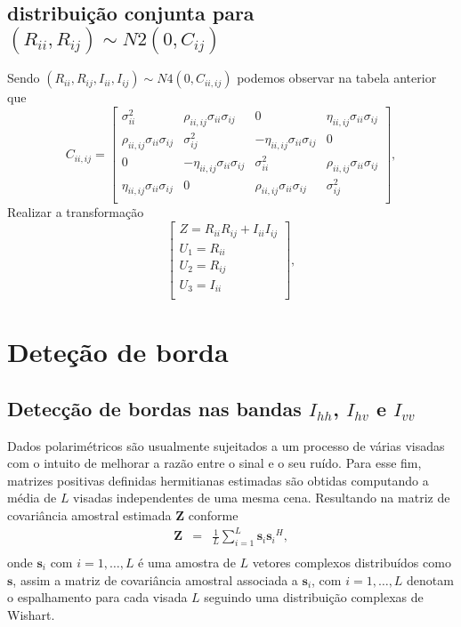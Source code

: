 \documentclass[conference]{IEEEtran}
\begin{document}
\subsection{distribuição conjunta para  $(R_{ii}, R_{ij})\sim N2(0, C_{ij})$}
Sendo $(R_{ii}, R_{ij},I_{ii}, I_{ij})\sim N4(0, C_{ii,ij})$ podemos observar na tabela anterior que 
\begin{equation}
C_{ii,ij}=\left[
\begin{array}{cccc}
	\sigma_{ii}^2   &  \rho_{ii,ij}\sigma_{ii}\sigma_{ij} & 0&\eta_{ii,ij}\sigma_{ii}\sigma_{ij}\\
	\rho_{ii,ij}\sigma_{ii}\sigma_{ij} & \sigma_{ij}^2  & -\eta_{ii,ij}\sigma_{ii}\sigma_{ij}&0 \\
	0&-\eta_{ii,ij}\sigma_{ii}\sigma_{ij}&\sigma_{ii}^2&\rho_{ii,ij}\sigma_{ii}\sigma_{ij}\\
	\eta_{ii,ij}\sigma_{ii}\sigma_{ij}&0&\rho_{ii,ij}\sigma_{ii}\sigma_{ij}&\sigma_{ij}^2\\
\end{array}
\right],
\end{equation}
Realizar a transformação 
\begin{equation}
\left[
\begin{array}{ccc}
	 Z = R_{ii}R_{ij}+I_{ii}I_{ij} \\
	 U_1 = R_{ii}\\
	 U_2 = R_{ij}\\
	 U_3 = I_{ii}\\
\end{array}
\right],
\end{equation}
\section{Deteção de borda}
\subsection{Detecção de bordas nas bandas $I_{hh}$, $I_{hv}$ e $I_{vv}$}
Dados polarimétricos são usualmente sujeitados a um processo de várias visadas com o intuito de melhorar a razão entre o sinal e o seu ruído. Para esse fim, matrizes positivas definidas hermitianas estimadas são obtidas computando a média de $L$ visadas independentes de uma mesma cena. Resultando na matriz de covariância amostral estimada {\bf Z} conforme \cite{good, ade}
\begin{equation}
\begin{array}{ccc}
    \mathbf{Z}&=&\frac{1}{L}\displaystyle{\sum_{i=1}^{L} {\mathbf{s}_i}{\mathbf{s}_i}^H}, \\
\end{array}
\end{equation}
onde $\mathbf{s}_i$ com $i = 1, \dots, L$ é uma amostra de $\mathit{L}$ vetores complexos distribuídos como $\mathbf{s}$, assim a matriz de covariância amostral associada a $\mathbf{s}_i$, com $i=1,\dots,L$ denotam o espalhamento para cada visada $L$ seguindo uma distribuição complexas de Wishart. 
\end{document}
